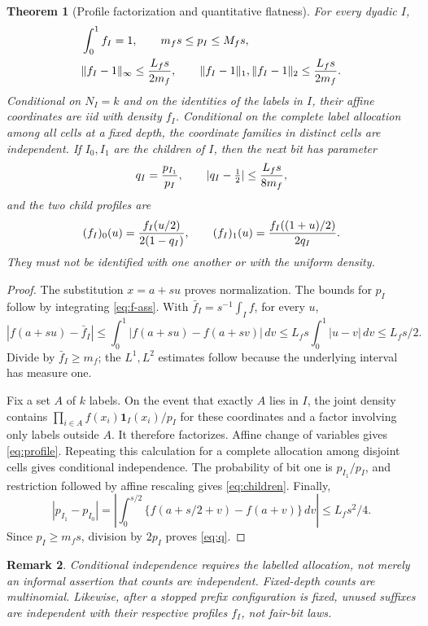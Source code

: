 \documentclass[11pt]{article}
\numberwithin{equation}{section}
\newtheorem{theorem}{Theorem}[section]
\newtheorem{remark}[theorem]{Remark}
\newcommand{\1}{\mathbf 1}\newcommand{\F}{\mathcal F}\newcommand{\D}{\mathcal D}
\newcommand{\norm}[1]{\lVert#1\rVert}
\begin{document}
\begin{theorem}[Profile factorization and quantitative flatness]\label{thm:profiles}
For every dyadic $I$,
\begin{align}
 &\int_0^1f_I=1,\qquad m_fs\le p_I\le M_fs,\label{eq:profile-basic}\\
 &\norm{f_I-1}_\infty\le {L_f s\over2m_f},\qquad
 \norm{f_I-1}_1,\norm{f_I-1}_2\le {L_fs\over2m_f}.
 \label{eq:flat}
\end{align}
Conditional on $N_I=k$ and on the identities of the labels in $I$, their
affine coordinates are iid with density $f_I$.  Conditional on the complete
label allocation among all cells at a fixed depth, the coordinate families
in distinct cells are independent.  If $I_0,I_1$ are the children of $I$,
then the next bit has parameter
\begin{equation}\label{eq:q}
q_I={p_{I_1}\over p_I},\qquad |q_I-\tfrac12|\le {L_fs\over8m_f},
\end{equation}
and the two child profiles are
\begin{equation}\label{eq:children}
 (f_I)_0(u)={f_I(u/2)\over2(1-q_I)},\qquad
 (f_I)_1(u)={f_I((1+u)/2)\over2q_I}.
\end{equation}
They must not be identified with one another or with the uniform density.
\end{theorem}
\begin{proof}
The substitution $x=a+su$ proves normalization.  The bounds for $p_I$
follow by integrating \eqref{eq:f-ass}.  With
$\bar f_I=s^{-1}\int_I f$, for every $u$,
\[
 |f(a+su)-\bar f_I|
 \le\int_0^1|f(a+su)-f(a+sv)|\,dv
 \le L_fs\int_0^1|u-v|\,dv\le L_fs/2.
\]
Divide by $\bar f_I\ge m_f$; the $L^1,L^2$ estimates follow because the
underlying interval has measure one.

Fix a set $A$ of $k$ labels.  On the event that exactly $A$ lies in $I$, the
joint density contains
$\prod_{i\in A}f(x_i)\1_I(x_i)/p_I$ for these coordinates and a factor
involving only labels outside $A$.  It therefore factorizes.  Affine change
of variables gives \eqref{eq:profile}.  Repeating this calculation for a
complete allocation among disjoint cells gives conditional independence.
The probability of bit one is $p_{I_1}/p_I$, and restriction followed by
affine rescaling gives \eqref{eq:children}.  Finally,
\[
 |p_{I_1}-p_{I_0}|
 =\left|\int_0^{s/2}\{f(a+s/2+v)-f(a+v)\}\,dv\right|
 \le L_fs^2/4.
\]
Since $p_I\ge m_fs$, division by $2p_I$ proves \eqref{eq:q}.
\end{proof}

\begin{remark}
Conditional independence requires the labelled allocation, not merely an
informal assertion that counts are independent.  Fixed-depth counts are
multinomial.  Likewise, after a stopped prefix configuration is fixed, unused
suffixes are independent with their respective profiles $f_I$, not fair-bit
laws.
\end{remark}
\end{document}
